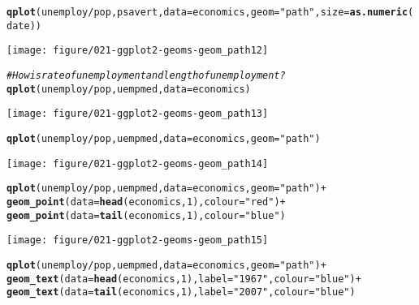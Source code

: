 \documentclass[a4paper,titlepage]{tufte-handout}\usepackage[]{graphicx}\usepackage[]{color}
\makeatletter
\def\maxwidth{ %
  \ifdim\Gin@nat@width>\linewidth
    \linewidth
  \else
    \Gin@nat@width
  \fi
}
\newcommand{\hlnum}[1]{\textcolor[rgb]{0.686,0.059,0.569}{#1}}%
\newcommand{\hlstr}[1]{\textcolor[rgb]{0.192,0.494,0.8}{#1}}%
\newcommand{\hlcom}[1]{\textcolor[rgb]{0.678,0.584,0.686}{\textit{#1}}}%
\newcommand{\hlopt}[1]{\textcolor[rgb]{0,0,0}{#1}}%
\newcommand{\hlstd}[1]{\textcolor[rgb]{0.345,0.345,0.345}{#1}}%
\newcommand{\hlkwc}[1]{\textcolor[rgb]{0.333,0.667,0.333}{#1}}%
\newcommand{\hlkwd}[1]{\textcolor[rgb]{0.737,0.353,0.396}{\textbf{#1}}}%
\newenvironment{kframe}{%
 \def\at@end@of@kframe{}%
 \ifinner\ifhmode%
  \def\at@end@of@kframe{\end{minipage}}%
  \begin{minipage}{\columnwidth}%
 \fi\fi%
 \def\FrameCommand##1{\hskip\@totalleftmargin \hskip-\fboxsep
 \colorbox{shadecolor}{##1}\hskip-\fboxsep
     \hskip-\linewidth \hskip-\@totalleftmargin \hskip\columnwidth}%
 \MakeFramed {\advance\hsize-\width
   \@totalleftmargin\z@ \linewidth\hsize
   \@setminipage}}%
 {\par\unskip\endMakeFramed%
 \at@end@of@kframe}
\newenvironment{knitrout}{}{} %
\makeatother
\begin{document}
\begin{knitrout}
\begin{kframe}
\begin{alltt}
\hlkwd{qplot}\hlstd{(unemploy}\hlopt{/}\hlstd{pop, psavert,} \hlkwc{data}\hlstd{=economics,} \hlkwc{geom}\hlstd{=}\hlstr{"path"}\hlstd{,} \hlkwc{size}\hlstd{=}\hlkwd{as.numeric}\hlstd{(date))}
\end{alltt}
\end{kframe}
\texttt{[image: figure/021-ggplot2-geoms-geom\_path12]} 
\begin{kframe}\begin{alltt}
\hlcom{# How is rate of unemployment and length of unemployment?}
\hlkwd{qplot}\hlstd{(unemploy}\hlopt{/}\hlstd{pop, uempmed,} \hlkwc{data}\hlstd{=economics)}
\end{alltt}
\end{kframe}
\texttt{[image: figure/021-ggplot2-geoms-geom\_path13]} 
\begin{kframe}\begin{alltt}
\hlkwd{qplot}\hlstd{(unemploy}\hlopt{/}\hlstd{pop, uempmed,} \hlkwc{data}\hlstd{=economics,} \hlkwc{geom}\hlstd{=}\hlstr{"path"}\hlstd{)}
\end{alltt}
\end{kframe}
\texttt{[image: figure/021-ggplot2-geoms-geom\_path14]} 
\begin{kframe}\begin{alltt}
\hlkwd{qplot}\hlstd{(unemploy}\hlopt{/}\hlstd{pop, uempmed,} \hlkwc{data}\hlstd{=economics,} \hlkwc{geom}\hlstd{=}\hlstr{"path"}\hlstd{)} \hlopt{+}
  \hlkwd{geom_point}\hlstd{(}\hlkwc{data}\hlstd{=}\hlkwd{head}\hlstd{(economics,} \hlnum{1}\hlstd{),} \hlkwc{colour}\hlstd{=}\hlstr{"red"}\hlstd{)} \hlopt{+}
  \hlkwd{geom_point}\hlstd{(}\hlkwc{data}\hlstd{=}\hlkwd{tail}\hlstd{(economics,} \hlnum{1}\hlstd{),} \hlkwc{colour}\hlstd{=}\hlstr{"blue"}\hlstd{)}
\end{alltt}
\end{kframe}
\texttt{[image: figure/021-ggplot2-geoms-geom\_path15]} 
\begin{kframe}\begin{alltt}
\hlkwd{qplot}\hlstd{(unemploy}\hlopt{/}\hlstd{pop, uempmed,} \hlkwc{data}\hlstd{=economics,} \hlkwc{geom}\hlstd{=}\hlstr{"path"}\hlstd{)} \hlopt{+}
  \hlkwd{geom_text}\hlstd{(}\hlkwc{data}\hlstd{=}\hlkwd{head}\hlstd{(economics,} \hlnum{1}\hlstd{),} \hlkwc{label}\hlstd{=}\hlstr{"1967"}\hlstd{,} \hlkwc{colour}\hlstd{=}\hlstr{"blue"}\hlstd{)} \hlopt{+}
  \hlkwd{geom_text}\hlstd{(}\hlkwc{data}\hlstd{=}\hlkwd{tail}\hlstd{(economics,} \hlnum{1}\hlstd{),} \hlkwc{label}\hlstd{=}\hlstr{"2007"}\hlstd{,} \hlkwc{colour}\hlstd{=}\hlstr{"blue"}\hlstd{)}

\end{alltt}
\end{kframe}
\end{knitrout}
\end{document}

